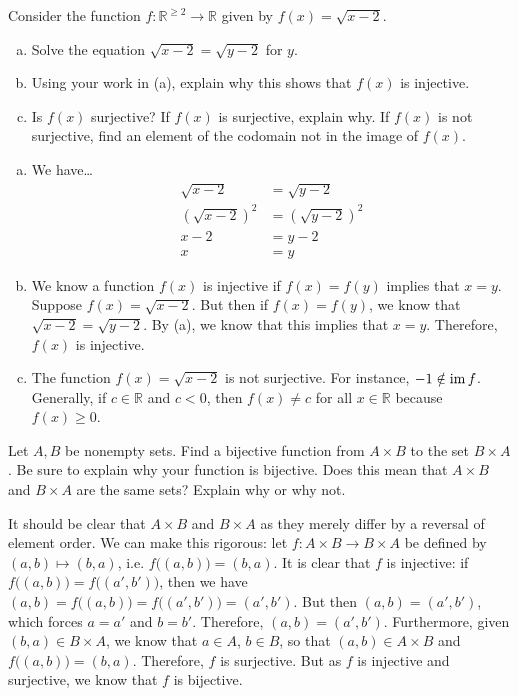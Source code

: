 \documentclass[11pt,letterpaper]{article}
\begin{document}
\newpage



 Consider the function $f: \mathbb{R}^{\geq 2} \to \mathbb{R}$ given by $f(x)= \sqrt{x - 2}$.
	\begin{enumerate}[(a)]
	\item Solve the equation $\sqrt{x - 2}= \sqrt{y - 2}$ for $y$. 
	\item Using your work in (a), explain why this shows that $f(x)$ is injective. 
	\item Is $f(x)$ surjective? If $f(x)$ is surjective, explain why. If $f(x)$ is not surjective, find an element of the codomain not in the image of $f(x)$. 
	\end{enumerate} \pspace

\sol 
\begin{enumerate}[(a)]
\item We have\dots
	\[
	\begin{aligned}
	\sqrt{x - 2}&= \sqrt{y - 2} \\[0.3cm]
	(\sqrt{x - 2})^2&= (\sqrt{y - 2})^2 \\[0.3cm]
	x - 2&= y - 2 \\[0.3cm]
	x&= y
	\end{aligned}
	\] \pspace

\item We know a function $f(x)$ is injective if $f(x)= f(y)$ implies that $x= y$. Suppose $f(x)= \sqrt{x - 2}$. But then if $f(x)= f(y)$, we know that $\sqrt{x - 2}= \sqrt{y - 2}$. By (a), we know that this implies that $x= y$. Therefore, $f(x)$ is injective. \pspace

\item The function $f(x)= \sqrt{x - 2}$ is not surjective. For instance, $-1 \notin \operatorname{im} f$. Generally, if $c \in \mathbb{R}$ and $c < 0$, then $f(x) \neq c$ for all $x \in \mathbb{R}$ because $f(x) \geq 0$. 
\end{enumerate}



\newpage



 Let $A, B$ be nonempty sets. Find a bijective function from $A \times B$ to the set $B \times A$. Be sure to explain why your function is bijective. Does this mean that $A \times B$ and $B \times A$ are the same sets? Explain why or why not. \pspace

\sol It should be clear that $A \times B$ and $B \times A$ as they merely differ by a reversal of element order. We can make this rigorous: let $f: A \times B \to B \times A$ be defined by $(a, b) \mapsto (b, a)$, i.e. $f\big( (a, b) \big)= (b, a)$. It is clear that $f$ is injective: if $f\big( (a, b) \big)= f\big( (a', b') \big)$, then we have $(a, b)= f\big( (a, b) \big)= f\big( (a', b') \big)= (a', b')$. But then $(a, b)= (a', b')$, which forces $a= a'$ and $b= b'$. Therefore, $(a, b)= (a', b')$. Furthermore, given $(b, a) \in B \times A$, we know that $a \in A$, $b \in B$, so that $(a, b) \in A \times B$ and $f\big( (a, b) \big)= (b, a)$. Therefore, $f$ is surjective. But as $f$ is injective and surjective, we know that $f$ is bijective. 
\end{document}
